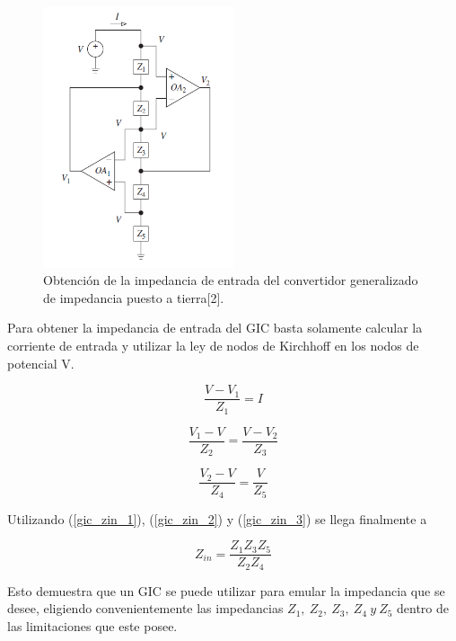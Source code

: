 \begin{figure}[H]
	\centering
	\includegraphics[width=0.5\textwidth]{Imagenes/gic_zin.PNG}
	\caption{Obtención de la impedancia de entrada del convertidor generalizado de impedancia puesto a tierra[2].}
	\label{fig:gic_zin}
\end{figure}

Para obtener la impedancia de entrada del GIC basta solamente calcular la corriente de entrada y utilizar la ley de nodos de Kirchhoff en los nodos de potencial V.

\begin{equation}
\frac{V-V_1}{Z_1}=I
\label{gic_zin_1}
\end{equation}

\begin{equation}
\frac{V_1-V}{Z_2} = \frac{V-V_2}{Z_3}
\label{gic_zin_2}
\end{equation}

\begin{equation}
\frac{V_2-V}{Z_4} = \frac{V}{Z_5}
\label{gic_zin_3}
\end{equation}

Utilizando (\ref{gic_zin_1}), (\ref{gic_zin_2}) y (\ref{gic_zin_3}) se llega finalmente a

\begin{equation}
Z_{in} = \frac{Z_1 Z_3 Z_5}{Z_2 Z_4}
\label{grounded_gic_zin}
\end{equation}

Esto demuestra que un GIC se puede utilizar para emular la impedancia que se desee, eligiendo convenientemente las impedancias $Z_1, \ Z_2, \ Z_3, \ Z_4 \ y \ Z_5$ dentro de las limitaciones que este posee.

